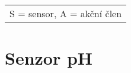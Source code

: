 \begin{table}[h]
\begin{tabular}{|l|l|l|l|l|}
            \end{tabular}
            \begin{tabular}{c}
                S = sensor, A = akční člen \\
            \end{tabular}
   
    \end{table}








\section{Senzor pH}
\label{sec:perif-sensor-ph}




